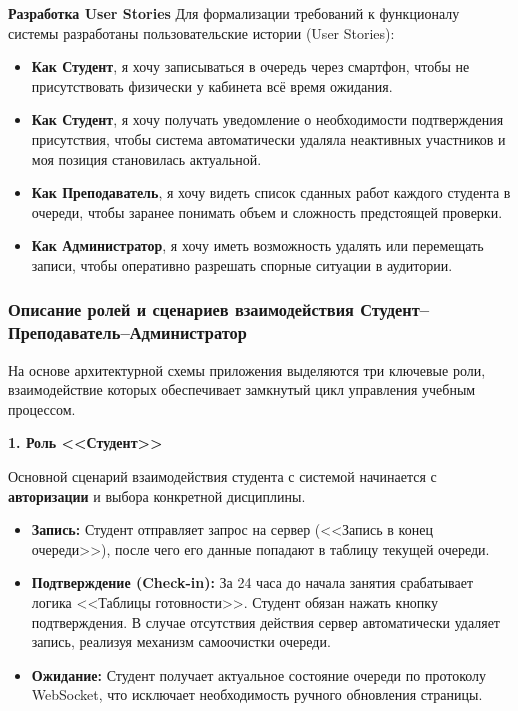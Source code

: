 \textbf{Разработка User Stories}
Для формализации требований к функционалу системы разработаны пользовательские истории (User Stories):

\begin{itemize}
    \item \textbf{Как Студент}, я хочу записываться в очередь через смартфон, чтобы не присутствовать физически
  у кабинета всё время ожидания.
    \item \textbf{Как Студент}, я хочу получать уведомление о необходимости подтверждения присутствия, 
 чтобы система автоматически удаляла неактивных участников и моя позиция становилась актуальной.
    \item \textbf{Как Преподаватель}, я хочу видеть список сданных работ каждого студента в очереди,
  чтобы заранее понимать объем и сложность предстоящей проверки.
    \item \textbf{Как Администратор}, я хочу иметь возможность удалять или перемещать записи, 
 чтобы оперативно разрешать спорные ситуации в аудитории.
\end{itemize}

\subsubsection{Описание ролей и сценариев взаимодействия Студент--Преподаватель--Администратор}

На основе архитектурной схемы приложения выделяются три ключевые роли, взаимодействие которых 
обеспечивает замкнутый цикл управления учебным процессом.

\textbf{1. Роль <<Студент>>}

Основной сценарий взаимодействия студента с системой начинается с \textbf{авторизации} и 
выбора конкретной дисциплины.

\begin{itemize}
    \item \textbf{Запись:} Студент отправляет запрос на сервер (<<Запись в конец очереди>>), 
	после чего его данные попадают в таблицу текущей очереди.
    \item \textbf{Подтверждение (Check-in):} За 24 часа до начала занятия срабатывает логика 
	<<Таблицы готовности>>. Студент обязан нажать кнопку подтверждения. В случае отсутствия 
	действия сервер автоматически удаляет запись, реализуя механизм самоочистки очереди.
    \item \textbf{Ожидание:} Студент получает актуальное состояние очереди по протоколу WebSocket, 
	что исключает необходимость ручного обновления страницы.
\end{itemize}


